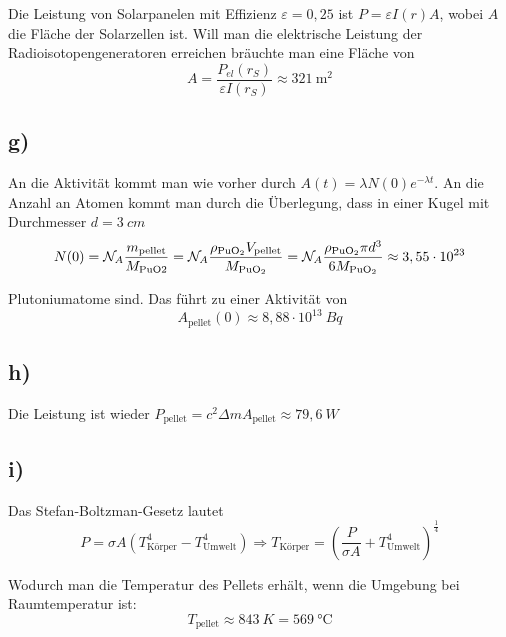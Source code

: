 \documentclass[12pt]{article}
\begin{document}
Die Leistung von Solarpanelen mit Effizienz $\varepsilon = 0,25$ ist $P = \varepsilon I(r) A$, wobei $A$ die Fläche der Solarzellen ist. Will man die elektrische Leistung der Radioisotopengeneratoren erreichen bräuchte man eine Fläche von
\begin{equation*}
    A = \frac{P_{el}(r_S)}{\varepsilon I(r_S)} \approx 321 \ \text{m}^2
\end{equation*}

\subsection{g)}

An die Aktivität kommt man wie vorher durch $A(t) = \lambda N(0) e^{-\lambda t}$. An die Anzahl an Atomen kommt man durch die Überlegung, dass in einer Kugel mit Durchmesser $d = 3 \ \si{cm}$
\begin{equation*}
    N(0) = \mathcal{N}_A \frac{m_{\text{pellet}}}{M_{\text{PuO2}}} = \mathcal{N}_A \frac{\rho_{\ce{PuO2}} V_{\text{pellet}}}{M_{\ce{PuO2}}} = \mathcal{N}_A \frac{\rho_{\ce{PuO2}} \pi d^3}{6 M_{\ce{PuO2}}}\approx 3,55 \cdot  10^{23}
\end{equation*}

Plutoniumatome sind. Das führt zu einer Aktivität von
\begin{equation*}
    A_{\text{pellet}}(0) \approx 8,88 \cdot 10^{13} \ \si{Bq}
\end{equation*}

\subsection{h)}

Die Leistung ist wieder $P_{\text{pellet}} = c^2 \Delta m A_{\text{pellet}} \approx 79,6 \ \si{W}$

\subsection{i)}

Das Stefan-Boltzman-Gesetz lautet 
\begin{equation*}
    P = \sigma A (T_{\text{Körper}}^4 - T_{\text{Umwelt}}^4) \Rightarrow T_{\text{Körper}} = \left( \frac{P}{\sigma A} + T_{\text{Umwelt}}^4 \right)^\frac{1}{4}
\end{equation*}

Wodurch man die Temperatur des Pellets erhält, wenn die Umgebung bei Raumtemperatur ist:
$$T_{\text{pellet}} \approx 843 \ \si{K} = 569 \ \si{\celsius}$$
\end{document}
